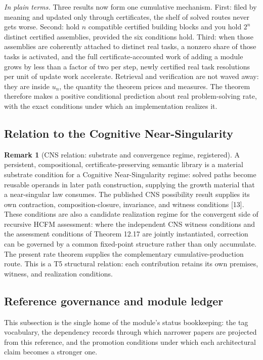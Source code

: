 \documentclass[11pt]{article}
\theoremstyle{definition}
\newtheorem{remark}{Remark}
\newcommand{\plainterms}{\emph{In plain terms.}}
\begin{document}
\noindent\plainterms{} Three results now form one cumulative mechanism. First: filed by meaning and updated only through certificates, the shelf of solved routes never gets worse. Second: hold $n$ compatible certified building blocks and you hold $2^n$ distinct certified assemblies, provided the six conditions hold. Third: when those assemblies are coherently attached to distinct real tasks, a nonzero share of those tasks is activated, and the full certificate-accounted work of adding a module grows by less than a factor of two per step, newly certified real task resolutions per unit of update work accelerate. Retrieval and verification are not waved away: they are inside $u_n$, the quantity the theorem prices and measures. The theorem therefore makes a positive conditional prediction about real problem-solving rate, with the exact conditions under which an implementation realizes it.

\subsection{Relation to the Cognitive Near-Singularity}

\begin{remark}[CNS relation: substrate and convergence regime, registered]
A persistent, compositional, certificate-preserving semantic library is a material substrate condition for a Cognitive Near-Singularity regime: solved paths become reusable operands in later path construction, supplying the growth material that a near-singular law consumes. The published CNS possibility result supplies its own contraction, composition-closure, invariance, and witness conditions [13]. These conditions are also a candidate realization regime for the convergent side of recursive HCFM assessment: where the independent CNS witness conditions and the assessment conditions of Theorem 12.17 are jointly instantiated, correction can be governed by a common fixed-point structure rather than only accumulate. The present rate theorem supplies the complementary cumulative-production route. This is a T5 structural relation: each contribution retains its own premises, witness, and realization conditions.
\end{remark}

\subsection{Reference governance and module ledger}

This subsection is the single home of the module's status bookkeeping: the tag vocabulary, the dependency records through which narrower papers are projected from this reference, and the promotion conditions under which each architectural claim becomes a stronger one.
\end{document}
